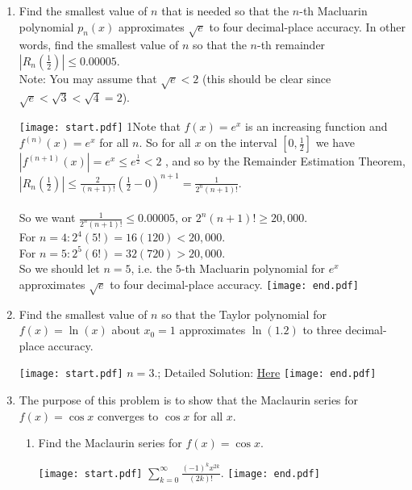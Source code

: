 \documentclass[12pt]{article}
\begin{document}
\begin{enumerate}
\item Find the smallest value of $n$ that is needed so that the $n$-th Macluarin polynomial $p_n(x)$ approximates $\sqrt{e}$ to four decimal-place accuracy.  In other words, find the smallest value of $n$
so that the $n$-th remainder $\textstyle |R_n(\frac{1}{2})| \leq 0.00005$.
\\ Note: You may assume that $\sqrt{e} < 2$ (this should be clear since $\sqrt{e}<\sqrt{3}<\sqrt{4}=2$). 

\texttt{[image: start.pdf]}
{{{1\linewidth}{Note that $f(x)=e^x$ is an increasing function and $f^{(n)}(x)=e^x$ for all $n$.  So for all $x$ on the interval $\textstyle [0, \frac{1}{2}]$  we have $|f^{(n+1)}(x)| = e^x \leq e^{\frac{1}{2}} < 2$
, and so by the Remainder Estimation Theorem, $\textstyle |R_n(\frac{1}{2})| \leq \frac{2}{(n+1)!} \left(\frac{1}{2} - 0 \right)^{n+1} = \frac{1}{2^n (n+1)!}$.
\\ \\ So we want $\textstyle \frac{1}{2^n (n+1)!} \leq 0.00005$, or $2^n (n+1)! \geq 20,000$.
\\ For $n=4: 2^4(5!) = 16(120) < 20,000$.
\\ For $n=5: 2^5(6!) = 32(720) > 20,000$.
\\ So we should let $n=5$, i.e. the $5$-th Macluarin polynomial for $e^{x}$ approximates $\sqrt{e}$ to four decimal-place accuracy. }}}
\texttt{[image: end.pdf]}


\item Find the smallest value of $n$ so that the Taylor polynomial for $f(x)=\ln(x)$ about $x_0=1$ approximates $\ln(1.2)$ to three decimal-place accuracy.

\texttt{[image: start.pdf]}
{{$n=3$.; Detailed Solution: \textcolor{blue}{\href{http://www.math.drexel.edu/classes/Calculus/resources/Math123HW/Solutions/123_13_Convergence_Of_Taylor_Series_04.pdf}{Here}}}}
\texttt{[image: end.pdf]}


\item The purpose of this problem is to show that the Maclaurin series for $f(x)=\cos{x}$ converges to $\cos{x}$ for all $x$.

\begin{enumerate}

\item Find the Maclaurin series for $f(x)=\cos{x}$.

\texttt{[image: start.pdf]}
{{$\sum_{k=0}^{\infty}{\frac{(-1)^k x^{2k}}{(2k)!}}$. }}
\texttt{[image: end.pdf]}



\end{enumerate}
\end{enumerate}
\end{document}
